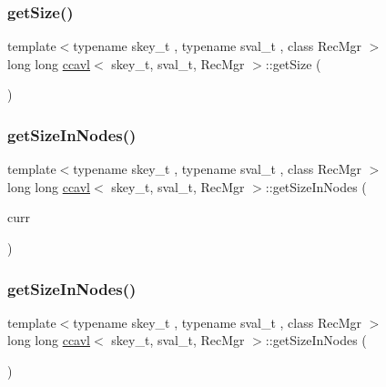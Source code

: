 \mbox{\label{classccavl_a0cba7a4d7634b04f0029d612d8ed2e0e}} 
\subsubsection{\texorpdfstring{get\+Size()}{getSize()}\hspace{0.1cm}{\footnotesize\ttfamily [2/2]}}
{\footnotesize\ttfamily template$<$typename skey\+\_\+t , typename sval\+\_\+t , class Rec\+Mgr $>$ \\
long long \hyperlink{classccavl}{ccavl}$<$ skey\+\_\+t, sval\+\_\+t, Rec\+Mgr $>$\+::get\+Size (\begin{DoxyParamCaption}{ }\end{DoxyParamCaption})\hspace{0.3cm}{\ttfamily [inline]}}

\mbox{\label{classccavl_ac537ecd0a2f9ab354d3e552da16c7b2a}} 
\subsubsection{\texorpdfstring{get\+Size\+In\+Nodes()}{getSizeInNodes()}\hspace{0.1cm}{\footnotesize\ttfamily [1/2]}}
{\footnotesize\ttfamily template$<$typename skey\+\_\+t , typename sval\+\_\+t , class Rec\+Mgr $>$ \\
long long \hyperlink{classccavl}{ccavl}$<$ skey\+\_\+t, sval\+\_\+t, Rec\+Mgr $>$\+::get\+Size\+In\+Nodes (\begin{DoxyParamCaption}\item[{\hyperlink{structnode__t}{node\+\_\+t}$<$ skey\+\_\+t, sval\+\_\+t $>$ $\ast$const}]{curr }\end{DoxyParamCaption})\hspace{0.3cm}{\ttfamily [inline]}}

\mbox{\label{classccavl_a3436a535b92e8199212b297d80c4ae6e}} 
\subsubsection{\texorpdfstring{get\+Size\+In\+Nodes()}{getSizeInNodes()}\hspace{0.1cm}{\footnotesize\ttfamily [2/2]}}
{\footnotesize\ttfamily template$<$typename skey\+\_\+t , typename sval\+\_\+t , class Rec\+Mgr $>$ \\
long long \hyperlink{classccavl}{ccavl}$<$ skey\+\_\+t, sval\+\_\+t, Rec\+Mgr $>$\+::get\+Size\+In\+Nodes (\begin{DoxyParamCaption}{ }\end{DoxyParamCaption})\hspace{0.3cm}{\ttfamily [inline]}}

